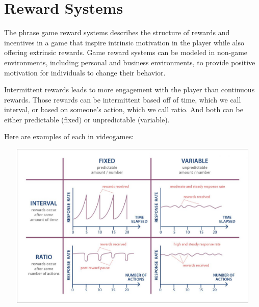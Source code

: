 \documentclass{article}
\begin{document}
\section{Reward Systems}
The phrase game reward systems describes the structure of rewards and incentives in a game that inspire intrinsic motivation in the player while also offering extrinsic rewards. Game reward systems can be modeled in non-game environments, including personal and business environments, to provide positive motivation for individuals to change their behavior.\cite{dowling2005electronic}

Intermittent rewards leads to more engagement with the player than continuous rewards. Those rewards can be intermittent based off of time, which we call interval, or based on someone’s action, which we call ratio. And both can be either predictable (fixed) or unpredictable (variable). 
\newline


Here are examples of each in videogames:
\newline

\includegraphics[width=14cm, height=8cm]{Graph.jpg}


\cite{hodent_2021}
\end{document}
